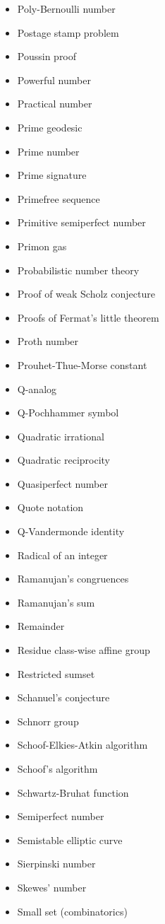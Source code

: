 \documentclass[12pt]{article}
\begin{document}
\begin{itemize}
\item Poly-Bernoulli number 
\item Postage stamp problem 
\item Poussin proof 
\item Powerful number 
\item Practical number 
\item Prime geodesic 
\item Prime number 
\item Prime signature 
\item Primefree sequence 
\item Primitive semiperfect number 
\item Primon gas 
\item Probabilistic number theory 
\item Proof of weak Scholz conjecture 
\item Proofs of Fermat's little theorem 
\item Proth number 
\item Prouhet-Thue-Morse constant 
\item Q-analog 
\item Q-Pochhammer symbol 
\item Quadratic irrational 
\item Quadratic reciprocity 
\item Quasiperfect number 
\item Quote notation 
\item Q-Vandermonde identity 
\item Radical of an integer 
\item Ramanujan's congruences 
\item Ramanujan's sum 
\item Remainder 
\item Residue class-wise affine group 
\item Restricted sumset 
\item Schanuel's conjecture 
\item Schnorr group 
\item Schoof-Elkies-Atkin algorithm 
\item Schoof's algorithm 
\item Schwartz-Bruhat function 
\item Semiperfect number 
\item Semistable elliptic curve 
\item Sierpinski number 
\item Skewes' number 
\item Small set (combinatorics) 

\end{itemize}
\end{document}
